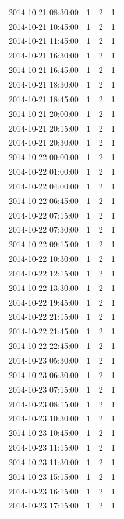 \begin{tabular}{lrrr}
2014-10-21 08:30:00 & 1 & 2 & 1 \\
2014-10-21 10:45:00 & 1 & 2 & 1 \\
2014-10-21 11:45:00 & 1 & 2 & 1 \\
2014-10-21 16:30:00 & 1 & 2 & 1 \\
2014-10-21 16:45:00 & 1 & 2 & 1 \\
2014-10-21 18:30:00 & 1 & 2 & 1 \\
2014-10-21 18:45:00 & 1 & 2 & 1 \\
2014-10-21 20:00:00 & 1 & 2 & 1 \\
2014-10-21 20:15:00 & 1 & 2 & 1 \\
2014-10-21 20:30:00 & 1 & 2 & 1 \\
2014-10-22 00:00:00 & 1 & 2 & 1 \\
2014-10-22 01:00:00 & 1 & 2 & 1 \\
2014-10-22 04:00:00 & 1 & 2 & 1 \\
2014-10-22 06:45:00 & 1 & 2 & 1 \\
2014-10-22 07:15:00 & 1 & 2 & 1 \\
2014-10-22 07:30:00 & 1 & 2 & 1 \\
2014-10-22 09:15:00 & 1 & 2 & 1 \\
2014-10-22 10:30:00 & 1 & 2 & 1 \\
2014-10-22 12:15:00 & 1 & 2 & 1 \\
2014-10-22 13:30:00 & 1 & 2 & 1 \\
2014-10-22 19:45:00 & 1 & 2 & 1 \\
2014-10-22 21:15:00 & 1 & 2 & 1 \\
2014-10-22 21:45:00 & 1 & 2 & 1 \\
2014-10-22 22:45:00 & 1 & 2 & 1 \\
2014-10-23 05:30:00 & 1 & 2 & 1 \\
2014-10-23 06:30:00 & 1 & 2 & 1 \\
2014-10-23 07:15:00 & 1 & 2 & 1 \\
2014-10-23 08:15:00 & 1 & 2 & 1 \\
2014-10-23 10:30:00 & 1 & 2 & 1 \\
2014-10-23 10:45:00 & 1 & 2 & 1 \\
2014-10-23 11:15:00 & 1 & 2 & 1 \\
2014-10-23 11:30:00 & 1 & 2 & 1 \\
2014-10-23 15:15:00 & 1 & 2 & 1 \\
2014-10-23 16:15:00 & 1 & 2 & 1 \\
2014-10-23 17:15:00 & 1 & 2 & 1 \\

\end{tabular}
